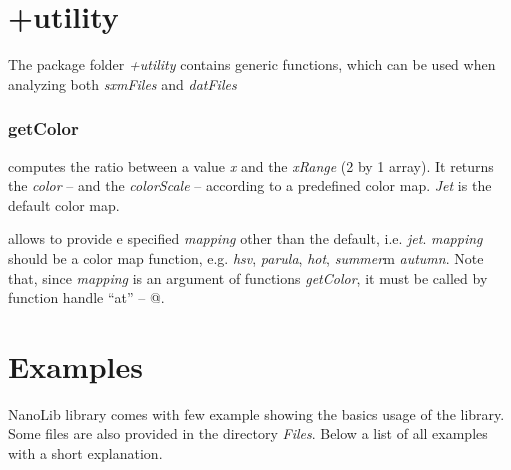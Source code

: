 \newpage
\tableofcontents





\section{+utility}

The package folder \emph{+utility} contains generic functions, which can be used when analyzing both \emph{sxmFiles} and \emph{datFiles}

\subsubsection{getColor}
\bdf
{} computes the ratio between a value \emph{x} and the \emph{xRange} (2 by 1 array). It returns the \emph{color} --  and the \emph{colorScale}  -- according to a predefined color map. \emph{Jet} is the default color map. 

 allows to provide e specified \emph{mapping} other than the default, i.e. \emph{jet}. \emph{mapping} should be a color map function, e.g. \emph{hsv}, \emph{parula}, \emph{hot}, \emph{summer}m \emph{autumn}. Note that, since \emph{mapping} is an argument of functions \emph{getColor}, it must be called by function handle ``at'' -- @.
\edf

\newpage

\section{Examples} 

NanoLib library comes with few example showing the basics usage of the library. Some files are also provided in the directory \emph{Files}.
Below a list of all examples with a short explanation.
